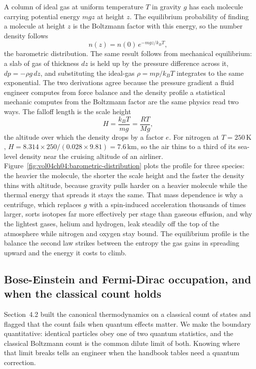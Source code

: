 A column of ideal gas at uniform temperature $T$ in gravity $g$ has each
molecule carrying potential energy $mgz$ at height $z$. The equilibrium
probability of finding a molecule at height $z$ is the Boltzmann factor with
this energy, so the number density follows
\[
n(z) = n(0)\,e^{-mgz/k_B T},
\]
the barometric distribution. The same result follows from mechanical
equilibrium: a slab of gas of thickness $dz$ is held up by the pressure
difference across it, $dp = -\rho g\,dz$, and substituting the ideal-gas
$\rho = mp/k_B T$ integrates to the same exponential. The two derivations agree
because the pressure gradient a fluid engineer computes from force balance and
the density profile a statistical mechanic computes from the Boltzmann factor
are the same physics read two ways. The falloff length is the scale height
\[
H = \frac{k_B T}{mg} = \frac{RT}{Mg},
\]
the altitude over which the density drops by a factor $e$. For nitrogen at $T =
250\,\si{\kelvin}$, $H = 8.314 \times 250/(0.028 \times 9.81) = 7.6\,\text{km}$,
so the air thins to a third of its sea-level density near the cruising altitude
of an airliner. Figure~\ref{fig:vol04ch04:barometric-distribution} plots the
profile for three species: the heavier the molecule, the shorter the scale
height and the faster the density thins with altitude, because gravity pulls
harder on a heavier molecule while the thermal energy that spreads it stays the
same. That mass dependence is why a centrifuge, which replaces $g$ with a
spin-induced acceleration thousands of times larger, sorts isotopes far more
effectively per stage than gaseous effusion, and why the lightest gases, helium
and hydrogen, leak steadily off the top of the atmosphere while nitrogen and
oxygen stay bound. The equilibrium profile is the balance the second law
strikes between the entropy the gas gains in spreading upward and the energy it
costs to climb.



\subsection{Bose-Einstein and Fermi-Dirac occupation, and when the classical count holds}

Section~4.2 built the canonical thermodynamics on a classical count of states
and flagged that the count fails when quantum effects matter. We make the
boundary quantitative: identical particles obey one of two quantum statistics,
and the classical Boltzmann count is the common dilute limit of both. Knowing
where that limit breaks tells an engineer when the handbook tables need a
quantum correction.

